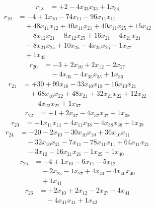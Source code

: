 \[\begin{aligned}
r_{18} &= + 2 - 4 x_{33} x_{33} + 1 x_{34}
\end{aligned}\]
\[\begin{aligned}
r_{19} &= - 4 + 1 x_{10} - 74 x_{11} - 96 x_{11} x_{11} \\
 &\quad + 48 x_{11} x_{12} + 40 x_{11} x_{21} + 40 x_{11} x_{25} + 15 x_{12} \\
 &\quad - 8 x_{12} x_{21} - 8 x_{12} x_{25} + 16 x_{21} - 4 x_{21} x_{21} \\
 &\quad - 8 x_{21} x_{25} + 10 x_{25} - 4 x_{25} x_{25} - 1 x_{27} \\
 &\quad + 1 x_{35}
\end{aligned}\]
\[\begin{aligned}
r_{20} &= - 3 + 2 x_{10} + 2 x_{12} - 2 x_{27} \\
 &\quad - 4 x_{35} - 4 x_{35} x_{35} + 1 x_{36}
\end{aligned}\]
\[\begin{aligned}
r_{21} &= + 30 + 99 x_{10} - 33 x_{10} x_{10} - 16 x_{10} x_{21} \\
 &\quad + 68 x_{10} x_{22} + 48 x_{21} + 32 x_{21} x_{22} + 12 x_{22} \\
 &\quad - 4 x_{22} x_{22} + 1 x_{37}
\end{aligned}\]
\[\begin{aligned}
r_{22} &= + 1 + 2 x_{37} - 4 x_{37} x_{37} + 1 x_{38}
\end{aligned}\]
\[\begin{aligned}
r_{23} &= - 1 x_{11} x_{11} - 4 x_{11} x_{38} - 4 x_{38} x_{38} + 1 x_{39}
\end{aligned}\]
\[\begin{aligned}
r_{24} &= - 20 - 2 x_{10} - 30 x_{10} x_{10} + 36 x_{10} x_{11} \\
 &\quad - 32 x_{10} x_{21} - 7 x_{11} - 78 x_{11} x_{11} + 64 x_{11} x_{21} \\
 &\quad - 3 x_{12} - 16 x_{21} x_{21} - 1 x_{25} + 1 x_{40}
\end{aligned}\]
\[\begin{aligned}
r_{25} &= - 4 + 1 x_{10} - 6 x_{11} - 5 x_{12} \\
 &\quad - 2 x_{25} - 1 x_{27} + 4 x_{40} - 4 x_{40} x_{40} \\
 &\quad + 1 x_{41}
\end{aligned}\]
\[\begin{aligned}
r_{26} &= + 2 x_{10} + 2 x_{12} - 2 x_{27} + 4 x_{41} \\
 &\quad - 4 x_{41} x_{41} + 1 x_{42}
\end{aligned}\]

